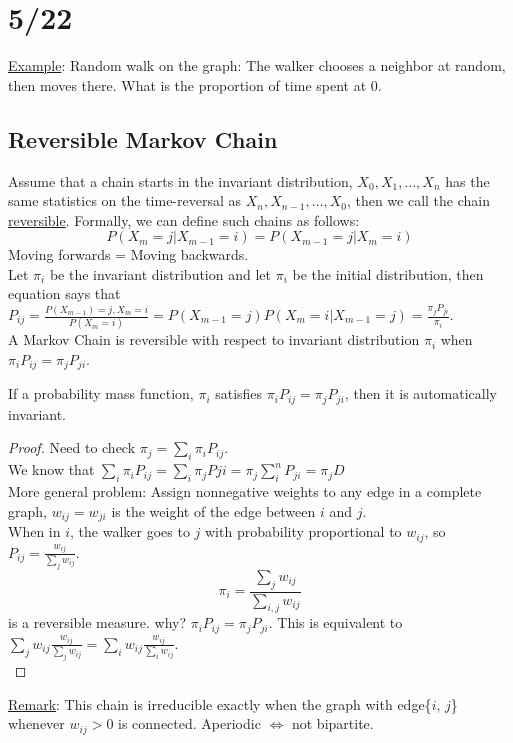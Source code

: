 \section*{5/22}
  \underline{Example}: Random walk on the graph: The walker chooses a neighbor at 
    random, then moves there. What is the proportion of time spent at 0.

  \subsection*{Reversible Markov Chain}
    Assume that a chain starts in the invariant distribution, $X_0, X_1, \ldots,
    X_n$ has the same statistics on the time-reversal as $X_n, X_{n-1}, \ldots,
    X_0$, then we call the chain \underline{reversible}.
    Formally, we can define such chains as follows:
    $$
      P(X_{m} = j | X_{m-1} = i) = P(X_{m-1} = j | X_m = i)
    $$
    Moving forwards = Moving backwards.\\

    Let $\pi_i$ be the invariant distribution and let $\pi_i$ be the initial
    distribution, then equation says that $P_{ij} = \frac{P(X_{m-1}) = j, 
    X_m = i}{P(X_m = i)} = P(X_{m-1} = j) P(X_{m} = i | X_{m - 1} = j) = 
    \frac{\pi_jP_{ji}}{\pi_i}$.\\

    A Markov Chain is reversible with respect to invariant distribution $\pi_i$
    when $\pi_i P_{ij} = \pi_j P_{ji}$.\\

    \begin{proposition}
    If a probability mass function, $\pi_i$ satisfies
    $\pi_iP_{ij} = \pi_jP_{ji}$, then it is automatically invariant.
    \end{proposition}
    \begin{proof}
      Need to check $\pi_j = \sum_i \pi_i P_{ij}$.\\
      We know that $\sum_i \pi_i P_{ij} = \sum_i \pi_j P{ji}
      = \pi_j \sum_{i}^n P_{ji} = \pi_j D$\\
      More general problem: Assign nonnegative weights to any edge in
      a complete graph, $w_{ij} = w_{ji}$ is the weight of the edge
      between $i$ and $j$.\\
      When in $i$, the walker goes to $j$ with probability 
      proportional to $w_{ij}$, so $P_{ij} = \frac{w_{ij}}{\sum_j
      w_{ij}}$.\\
      $$
        \pi_i = \frac{\sum_j w_{ij}}{\sum_{i,j} w_{ij}}
      $$
      is a reversible measure. why? $\pi_i P_{ij} = \pi_j P_{ji}$.
      This is equivalent to $\sum_j w_{ij} \frac{w_{ij}}{\sum_j 
      w_{ij}} = \sum_i w_{ij} \frac{w_{ij}}{\sum_i w_{ij}}$.\\
    \end{proof}
    \underline{Remark}: This chain is irreducible exactly when the
      graph with edge\{$i$, $j$\} whenever $w_{ij} > 0$ is connected.
      Aperiodic $\Leftrightarrow$ not bipartite.\\


